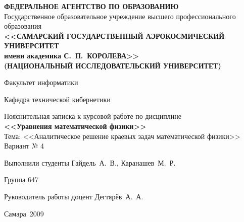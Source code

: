 \begin{titlepage}
\newpage

\begin{center}
\scriptsize
\textbf{ФЕДЕРАЛЬНОЕ АГЕНТСТВО ПО ОБРАЗОВАНИЮ}\\
Государственное образовательное учреждение высшего профессионального образования\\
\textbf{<<САМАРСКИЙ ГОСУДАРСТВЕННЫЙ АЭРОКОСМИЧЕСКИЙ УНИВЕРСИТЕТ}\\
\textbf{имени академика С.~П.~КОРОЛЕВА>>}\\
\textbf{(НАЦИОНАЛЬНЫЙ ИССЛЕДОВАТЕЛЬСКИЙ УНИВЕРСИТЕТ)}
\normalsize

\vfill

Факультет информатики

Кафедра технической кибернетики

\vfill
\normalsize
Пояснительная записка к курсовой работе по дисциплине\\ \textbf{<<Уравнения математической физики>>}\\
\Large
Тема: <<Аналитическое решение краевых задач математической физики>>\\
\normalsize
Вариант № 4
\end{center}

\vfill

Выполнили студенты Гайдель~А.~В., Каранашев~М.~Р.

Группа 647

Руководитель работы доцент Дегтярёв~А.~А.


\vfill

\begin{center}
Самара~2009
\end{center}
\end{titlepage}